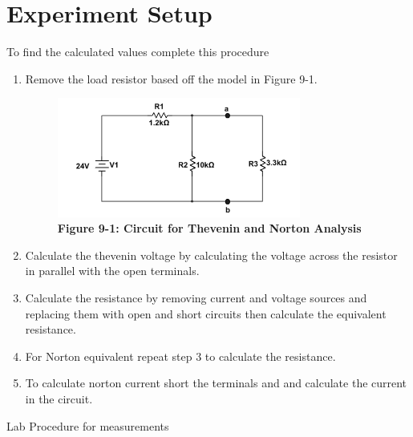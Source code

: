 \documentclass[a4paper]{article}
\begin{document}
\section{Experiment Setup}
To find the calculated values complete this procedure
\begin{enumerate}
    \item Remove the load resistor based off the model in Figure 9-1.
    \begin{center}
        \begin{figure}[H]\label{fig9-3}
            \begin{center}
                \includegraphics[width = 8cm]{Fig9-3}\\
                \small\textbf{Figure 9-1: Circuit for Thevenin and Norton Analysis \cite{UNCC-ECE-Dept:2023}}
            \end{center}
        \end{figure}
    \end{center}
    \item Calculate the thevenin voltage by calculating the voltage across the resistor in parallel with the open terminals.
    \item Calculate the resistance by removing current and voltage sources and replacing them with open and short circuits then calculate the equivalent resistance.
    \item For Norton equivalent repeat step 3 to calculate the resistance.
    \item To calculate norton current short the terminals and and calculate the current in the circuit.
\end{enumerate} 
\vspace{.5cm}
Lab Procedure for measurements
\end{document}
